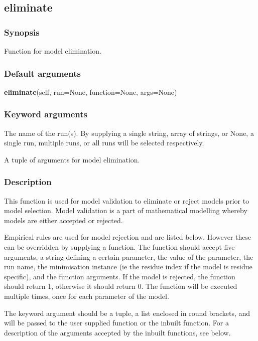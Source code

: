 \newpage

\subsection{eliminate}


\subsubsection{Synopsis}

Function for model elimination.

\subsubsection{Default arguments}

\textsf{\textbf{eliminate}(self, run=None, function=None, args=None)}


\subsubsection{Keyword arguments}

  The name of the run(s).  By supplying a single string, array of strings, or None, a single run, multiple runs, or all runs will be selected respectively.

  A tuple of arguments for model elimination.

\subsubsection{Description}

This function is used for model validation to eliminate or reject models prior to model
selection.  Model validation is a part of mathematical modelling whereby models are either
accepted or rejected.

Empirical rules are used for model rejection and are listed below.  However these can be
overridden by supplying a function.  The function should accept five arguments, a string
defining a certain parameter, the value of the parameter, the run name, the minimisation
instance (ie the residue index if the model is residue specific), and the function
arguments.  If the model is rejected, the function should return 1, otherwise it should
return 0.  The function will be executed multiple times, once for each parameter of the
model.

The 
 keyword argument should be a tuple, a list enclosed in round brackets, and will
be passed to the user supplied function or the inbuilt function.  For a description of the
arguments accepted by the inbuilt functions, see below.

